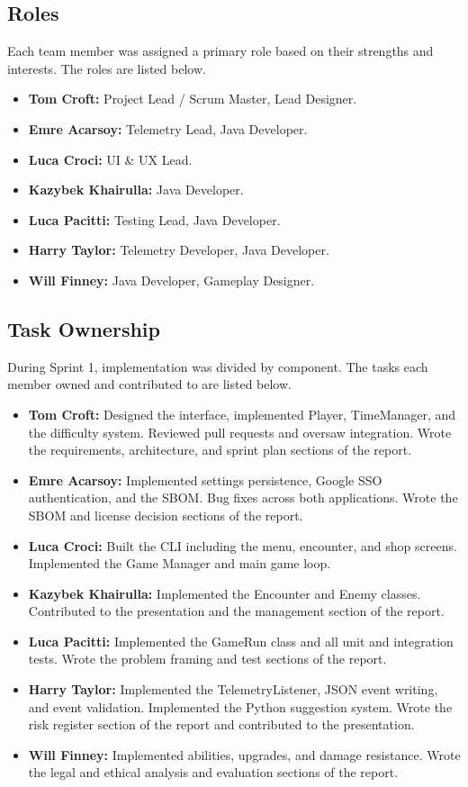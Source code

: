 \subsection{Roles}
Each team member was assigned a primary role based on their strengths and interests. The roles are listed below.
\begin{itemize}
    \item \textbf{Tom Croft:} Project Lead / Scrum Master, Lead Designer.
    \item \textbf{Emre Acarsoy:} Telemetry Lead, Java Developer.
    \item \textbf{Luca Croci:} UI \& UX Lead.
    \item \textbf{Kazybek Khairulla:} Java Developer.
    \item \textbf{Luca Pacitti:} Testing Lead, Java Developer.
    \item \textbf{Harry Taylor:} Telemetry Developer, Java Developer.
    \item \textbf{Will Finney:} Java Developer, Gameplay Designer.
\end{itemize}

\subsection{Task Ownership}
During Sprint 1, implementation was divided by component. The tasks each member owned and contributed to are listed below.
\begin{itemize}
    \item \textbf{Tom Croft:} Designed the interface, implemented Player, TimeManager, and the difficulty system. Reviewed pull requests and oversaw integration. Wrote the requirements, architecture, and sprint plan sections of the report.
    \item \textbf{Emre Acarsoy:} Implemented settings persistence, Google SSO authentication, and the SBOM. Bug fixes across both applications. Wrote the SBOM and license decision sections of the report.
    \item \textbf{Luca Croci:} Built the CLI including the menu, encounter, and shop screens. Implemented the Game Manager and main game loop.
    \item \textbf{Kazybek Khairulla:} Implemented the Encounter and Enemy classes. Contributed to the presentation and the management section of the report.
    \item \textbf{Luca Pacitti:} Implemented the GameRun class and all unit and integration tests. Wrote the problem framing and test sections of the report.
    \item \textbf{Harry Taylor:} Implemented the TelemetryListener, JSON event writing, and event validation. Implemented the Python suggestion system. Wrote the risk register section of the report and contributed to the presentation.
    \item \textbf{Will Finney:} Implemented abilities, upgrades, and damage resistance. Wrote the legal and ethical analysis and evaluation sections of the report.
\end{itemize}

